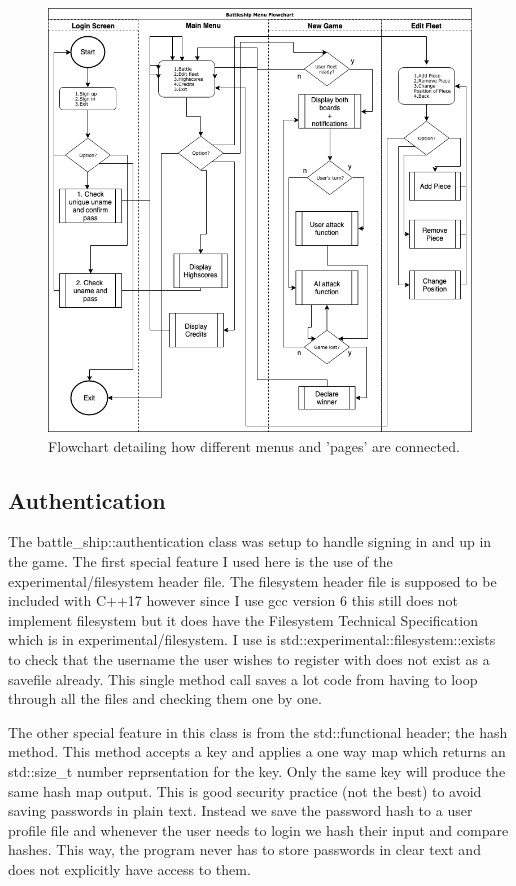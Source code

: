 \documentclass[11pt]{article} %
\begin{document}
\begin{figure}
\centering
\includegraphics[scale=0.75]{images/menu.png}
\caption{Flowchart detailing how different menus and 'pages' are connected.}
\label{fig:all_menus}
\end{figure}
\clearpage
\subsection{Authentication}
The battle\_ship::authentication class was setup to handle signing in and up in the game.
The first special feature I used here is the use of the experimental/filesystem header file.
The filesystem header file is supposed to be included with C++17 however since I use gcc version 6
this still does not implement filesystem but it does have the Filesystem Technical Specification which is in
 experimental/filesystem. I use is std::experimental::filesystem::exists to check that the username
the user wishes to register with does not exist as a savefile already.
This single method call saves a lot code from having to loop through all the files
and checking them one by one.
\\
\par The other special feature in this class is from the std::functional header; the hash method.
This method accepts a key and applies a one way map which returns an std::size\_t number
reprsentation for the key.
Only the same key will produce the same hash map output.
This is good security practice (not the best) to avoid saving passwords in plain text.
Instead we save the password hash to a user profile file and whenever the user needs to login we hash their input and compare hashes.
This way, the program never has to store passwords in clear text and does not explicitly have access to them.
\end{document}
